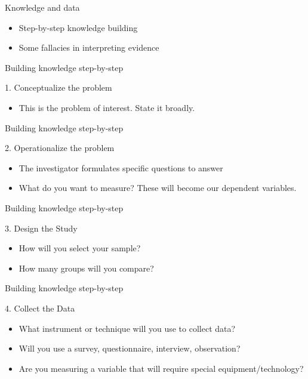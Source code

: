 \documentclass[14pt]{beamer}\usepackage[]{graphicx}\usepackage[]{color}
\begin{document}
\begin{frame}[fragile]{Knowledge and data}

\begin{itemize}
\item Step-by-step knowledge building
\item Some fallacies in interpreting evidence
\end{itemize}
\end{frame}

\begin{frame}[fragile]{Building knowledge step-by-step}

1. Conceptualize the problem

\begin{itemize}
\item This is the problem of interest.  State it broadly.
\end{itemize}
\end{frame}

\begin{frame}[fragile]{Building knowledge step-by-step}

2. Operationalize the problem

\begin{itemize}
\item The investigator formulates specific questions to answer
\item What do you want to measure?  These will become our dependent variables.
\end{itemize}
\end{frame}

\begin{frame}[fragile]{Building knowledge step-by-step}

3. Design the Study

\begin{itemize}
\item How will you select your sample?
\item How many groups will you compare?
\end{itemize}
\end{frame}

\begin{frame}[fragile]{Building knowledge step-by-step}

4. Collect the Data

\begin{itemize}
\item What instrument or technique will you use to collect data?
\item Will you use a survey, questionnaire, interview, observation?
\item Are you measuring a variable that will require special equipment/technology?
\end{itemize}
\end{frame}
\end{document}
